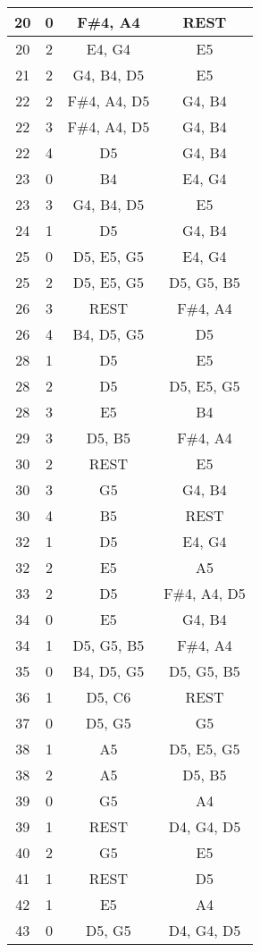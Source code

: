 \documentclass{article}
\begin{document}
\begin{longtable}{|c|c|c|c|}
\hline
20 & 0 & F\#4, A4 & REST \\ 
\hline
20 & 2 & E4, G4 & E5 \\ 
\hline
21 & 2 & G4, B4, D5 & E5 \\ 
\hline
22 & 2 & F\#4, A4, D5 & G4, B4 \\ 
22 & 3 & F\#4, A4, D5 & G4, B4 \\ 
22 & 4 & D5 & G4, B4 \\ 
\hline
23 & 0 & B4 & E4, G4 \\ 
23 & 3 & G4, B4, D5 & E5 \\ 
\hline
24 & 1 & D5 & G4, B4 \\ 
\hline
25 & 0 & D5, E5, G5 & E4, G4 \\ 
25 & 2 & D5, E5, G5 & D5, G5, B5 \\ 
\hline
26 & 3 & REST & F\#4, A4 \\ 
26 & 4 & B4, D5, G5 & D5 \\ 
\hline
28 & 1 & D5 & E5 \\ 
\hline
28 & 2 & D5 & D5, E5, G5 \\ 
28 & 3 & E5 & B4 \\ 
\hline
29 & 3 & D5, B5 & F\#4, A4 \\ 
\hline
30 & 2 & REST & E5 \\ 
30 & 3 & G5 & G4, B4 \\ 
30 & 4 & B5 & REST \\ 
\hline
32 & 1 & D5 & E4, G4 \\ 
\hline
32 & 2 & E5 & A5 \\ 
\hline
33 & 2 & D5 & F\#4, A4, D5 \\ 
\hline
34 & 0 & E5 & G4, B4 \\ 
34 & 1 & D5, G5, B5 & F\#4, A4 \\ 
\hline
35 & 0 & B4, D5, G5 & D5, G5, B5 \\ 
\hline
36 & 1 & D5, C6 & REST \\ 
\hline
37 & 0 & D5, G5 & G5 \\ 
\hline
38 & 1 & A5 & D5, E5, G5 \\ 
38 & 2 & A5 & D5, B5 \\ 
\hline
39 & 0 & G5 & A4 \\ 
39 & 1 & REST & D4, G4, D5 \\ 
\hline
40 & 2 & G5 & E5 \\ 
\hline
41 & 1 & REST & D5 \\ 
\hline
42 & 1 & E5 & A4 \\ 
\hline
43 & 0 & D5, G5 & D4, G4, D5 \\ 

\end{longtable}
\end{document}
